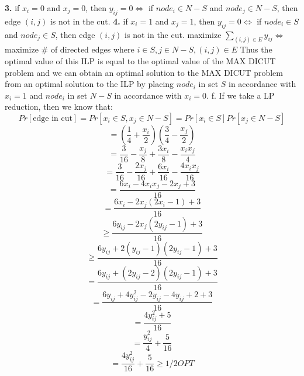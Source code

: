 \documentclass[oneside]{projectpaper} %
\begin{document}
\newline
\textbf{3.} if $x_i = 0$ and $x_j = 0$, then $y_{ij} = 0 \Leftrightarrow$ if $node_i \in N-S$ and $node_j \in N-S$, then edge $(i,j)$ is not in the cut.
\newline
\textbf{4.} if $x_i = 1$ and $x_j = 1$, then $y_{ij} = 0 \Leftrightarrow$ if $node_i \in S$ and $node_j \in S$, then edge $(i,j)$ is not in the cut.
\newline
\newline
maximize $\sum\limits_{(i,j) \in E}y_{ij} \Leftrightarrow$ maximize \# of directed edges where $i \in S, j \in N-S, (i,j) \in E$
\newline
\newline
Thus the optimal value of this ILP is equal to the optimal value of the MAX DICUT problem and we can obtain an optimal solution to the MAX DICUT problem from an optimal solution to the ILP by placing $node_i$ in set $S$ in accordance with $x_i = 1$ and $node_i$ in set $N-S$ in accordance with $x_i = 0$.
\newline
\newline
{\large f.} If we take a LP reduction, then we know that: $$Pr[\text{edge in cut}] = Pr[x_i \in S, x_j \in N-S] = Pr[x_i \in S]Pr[x_j \in N-S]$$ 
$$=(\frac{1}{4} + \frac{x_i}{2})(\frac{3}{4} - \frac{x_j}{2})$$
$$=\frac{3}{16} - \frac{x_j}{8} + \frac{3x_i}{8} - \frac{x_i x_j}{4}$$
$$= \frac{3}{16} - \frac{2x_j}{16} + \frac{6x_i}{16} - \frac{4x_i x_j}{16}$$
$$= \frac{6x_i - 4x_i x_j - 2x_j + 3}{16}$$
$$= \frac{6x_i - 2x_j(2x_i - 1) + 3}{16}$$
$$\geq \frac{6y_{ij} - 2x_j(2y_{ij} - 1) + 3}{16}$$
$$\geq \frac{6y_{ij} + 2(y_{ij} - 1)(2y_{ij} - 1) + 3}{16}$$
$$= \frac{6y_{ij} + (2y_{ij} - 2)(2y_{ij} - 1) + 3}{16}$$
$$= \frac{6y_{ij} + 4y_{ij}^2 - 2y_{ij} - 4y_{ij} + 2 + 3}{16}$$
$$= \frac{4y_{ij}^2 + 5}{16}$$
$$= \frac{y_{ij}^2}{4} + \frac{5}{16}$$
$$= \frac{4y_{ij}^2}{16} + \frac{5}{16} \geq 1/2OPT$$
\end{document}

